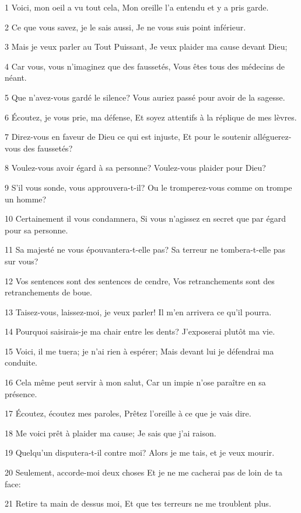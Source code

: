 \par 1 Voici, mon oeil a vu tout cela, Mon oreille l'a entendu et y a pris garde.
\par 2 Ce que vous savez, je le sais aussi, Je ne vous suis point inférieur.
\par 3 Mais je veux parler au Tout Puissant, Je veux plaider ma cause devant Dieu;
\par 4 Car vous, vous n'imaginez que des faussetés, Vous êtes tous des médecins de néant.
\par 5 Que n'avez-vous gardé le silence? Vous auriez passé pour avoir de la sagesse.
\par 6 Écoutez, je vous prie, ma défense, Et soyez attentifs à la réplique de mes lèvres.
\par 7 Direz-vous en faveur de Dieu ce qui est injuste, Et pour le soutenir alléguerez-vous des faussetés?
\par 8 Voulez-vous avoir égard à sa personne? Voulez-vous plaider pour Dieu?
\par 9 S'il vous sonde, vous approuvera-t-il? Ou le tromperez-vous comme on trompe un homme?
\par 10 Certainement il vous condamnera, Si vous n'agissez en secret que par égard pour sa personne.
\par 11 Sa majesté ne vous épouvantera-t-elle pas? Sa terreur ne tombera-t-elle pas sur vous?
\par 12 Vos sentences sont des sentences de cendre, Vos retranchements sont des retranchements de boue.
\par 13 Taisez-vous, laissez-moi, je veux parler! Il m'en arrivera ce qu'il pourra.
\par 14 Pourquoi saisirais-je ma chair entre les dents? J'exposerai plutôt ma vie.
\par 15 Voici, il me tuera; je n'ai rien à espérer; Mais devant lui je défendrai ma conduite.
\par 16 Cela même peut servir à mon salut, Car un impie n'ose paraître en sa présence.
\par 17 Écoutez, écoutez mes paroles, Prêtez l'oreille à ce que je vais dire.
\par 18 Me voici prêt à plaider ma cause; Je sais que j'ai raison.
\par 19 Quelqu'un disputera-t-il contre moi? Alors je me tais, et je veux mourir.
\par 20 Seulement, accorde-moi deux choses Et je ne me cacherai pas de loin de ta face:
\par 21 Retire ta main de dessus moi, Et que tes terreurs ne me troublent plus.
